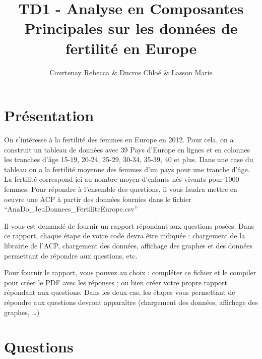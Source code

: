 \documentclass[
]{article}
\title{TD1 - Analyse en Composantes Principales sur les données de
fertilité en Europe}
\author{Courtenay Rebecca \& Ducros Chloé \& Lasson Marie}
\date{}
\begin{document}
\maketitle

{
\setcounter{tocdepth}{2}
\tableofcontents
}
\hypertarget{pruxe9sentation}{%
\section{Présentation}\label{pruxe9sentation}}

On s'intéresse à la fertilité des femmes en Europe en 2012. Pour cela,
on a construit un tableau de données avec 39 Pays d'Europe en lignes et
en colonnes les tranches d'âge 15-19, 20-24, 25-29, 30-34, 35-39, 40 et
plus. Dans une case du tableau on a la fertilité moyenne des femmes d'un
pays pour une tranche d'âge. La fertilité correspond ici au nombre moyen
d'enfants nés vivants pour 1000 femmes. Pour répondre à l'ensemble des
questions, il vous faudra mettre en oeuvre une ACP à partir des données
fournies dans le fichier ``AnaDo\_JeuDonnees\_FertiliteEurope.csv''

Il vous est demandé de fournir un rapport répondant aux questions
posées. Dans ce rapport, chaque étape de votre code devra être indiquée
: chargement de la librairie de l'ACP, chargement des données, affichage
des graphes et des données permettant de répondre aux questions, etc.

Pour fournir le rapport, vous pouvez au choix : compléter ce fichier et
le compiler pour créer le PDF avec les réponses ; ou bien créer votre
propre rapport répondant aux questions. Dans les deux cas, les étapes
vous permettant de répondre aux questions devront apparaître (chargement
des données, affichage des graphes, \ldots)

\hypertarget{questions}{%
\section{Questions}\label{questions}}
\end{document}
